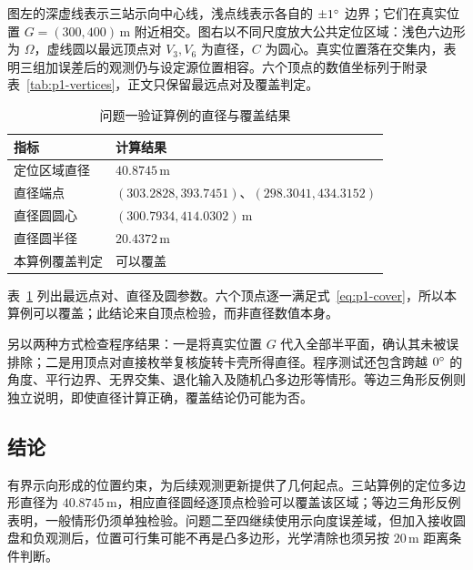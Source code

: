 图左的深虚线表示三站示向中心线，浅点线表示各自的 \(\pm1^{\circ}\) 边界；它们在真实位置 \(G=(300,400)\,\mathrm m\) 附近相交。图右以不同尺度放大公共定位区域：浅色六边形为 \(\Omega\)，虚线圆以最远顶点对 \(V_3,V_6\) 为直径，\(C\) 为圆心。真实位置落在交集内，表明三组加误差后的观测仍与设定源位置相容。六个顶点的数值坐标列于附录表~\ref{tab:p1-vertices}，正文只保留最远点对及覆盖判定。

\begin{table}[H]
  \centering
  \caption{问题一验证算例的直径与覆盖结果}
  \label{tab:p1-result}
  \begin{tabular}{ll}
    \toprule
    指标 & 计算结果 \\
    \midrule
    定位区域直径 & \(40.8745\,\mathrm{m}\) \\
    直径端点 & \((303.2828,393.7451)\)、\((298.3041,434.3152)\) \\
    直径圆圆心 & \((300.7934,414.0302)\,\mathrm{m}\) \\
    直径圆半径 & \(20.4372\,\mathrm{m}\) \\
    本算例覆盖判定 & 可以覆盖 \\
    \bottomrule
  \end{tabular}
\end{table}

表~\ref{tab:p1-result} 列出最远点对、直径及圆参数。六个顶点逐一满足式~\eqref{eq:p1-cover}，所以本算例可以覆盖；此结论来自顶点检验，而非直径数值本身。

另以两种方式检查程序结果：一是将真实位置 \(G\) 代入全部半平面，确认其未被误排除；二是用顶点对直接枚举复核旋转卡壳所得直径。程序测试还包含跨越 \(0^{\circ}\) 的角度、平行边界、无界交集、退化输入及随机凸多边形等情形。等边三角形反例则独立说明，即使直径计算正确，覆盖结论仍可能为否。

\subsection{结论}

有界示向形成的位置约束，为后续观测更新提供了几何起点。三站算例的定位多边形直径为 \(40.8745\,\mathrm{m}\)，相应直径圆经逐顶点检验可以覆盖该区域；等边三角形反例表明，一般情形仍须单独检验。问题二至四继续使用示向度误差域，但加入接收圆盘和负观测后，位置可行集可能不再是凸多边形，光学清除也须另按 \(20\,\mathrm{m}\) 距离条件判断。
